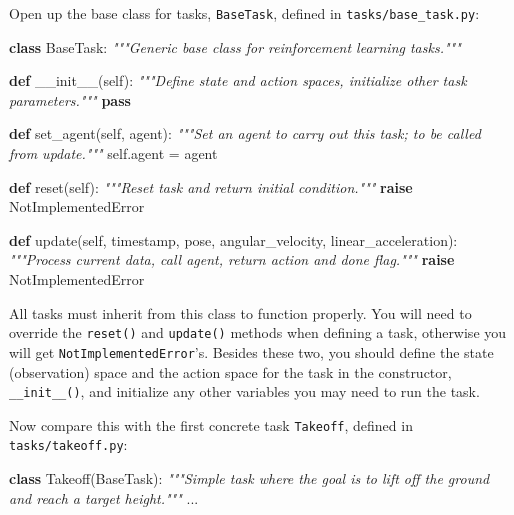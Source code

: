 \documentclass[11pt]{article}
\newenvironment{Shaded}{}{}
\newcommand{\KeywordTok}[1]{\textcolor[rgb]{0.00,0.44,0.13}{\textbf{{#1}}}}
\newcommand{\CommentTok}[1]{\textcolor[rgb]{0.38,0.63,0.69}{\textit{{#1}}}}
\newcommand{\FunctionTok}[1]{\textcolor[rgb]{0.02,0.16,0.49}{{#1}}}
\newcommand{\NormalTok}[1]{{#1}}
\newcommand{\VariableTok}[1]{\textcolor[rgb]{0.10,0.09,0.49}{{#1}}}
\newcommand{\ControlFlowTok}[1]{\textcolor[rgb]{0.00,0.44,0.13}{\textbf{{#1}}}}
\newcommand{\OperatorTok}[1]{\textcolor[rgb]{0.40,0.40,0.40}{{#1}}}
\newcommand{\PreprocessorTok}[1]{\textcolor[rgb]{0.74,0.48,0.00}{{#1}}}
\begin{document}
Open up the base class for tasks, \texttt{BaseTask}, defined in
\texttt{tasks/base\_task.py}:

\begin{Shaded}
\begin{Highlighting}[]
\KeywordTok{class}\NormalTok{ BaseTask:}
    \CommentTok{"""Generic base class for reinforcement learning tasks."""}

    \KeywordTok{def} \FunctionTok{__init__}\NormalTok{(}\VariableTok{self}\NormalTok{):}
        \CommentTok{"""Define state and action spaces, initialize other task parameters."""}
        \ControlFlowTok{pass}
    
    \KeywordTok{def}\NormalTok{ set_agent(}\VariableTok{self}\NormalTok{, agent):}
        \CommentTok{"""Set an agent to carry out this task; to be called from update."""}
        \VariableTok{self}\NormalTok{.agent }\OperatorTok{=}\NormalTok{ agent}
    
    \KeywordTok{def}\NormalTok{ reset(}\VariableTok{self}\NormalTok{):}
        \CommentTok{"""Reset task and return initial condition."""}
        \ControlFlowTok{raise} \PreprocessorTok{NotImplementedError}
    
    \KeywordTok{def}\NormalTok{ update(}\VariableTok{self}\NormalTok{, timestamp, pose, angular_velocity, linear_acceleration):}
        \CommentTok{"""Process current data, call agent, return action and done flag."""}
        \ControlFlowTok{raise} \PreprocessorTok{NotImplementedError}            
\end{Highlighting}
\end{Shaded}

All tasks must inherit from this class to function properly. You will
need to override the \texttt{reset()} and \texttt{update()} methods when
defining a task, otherwise you will get \texttt{NotImplementedError}'s.
Besides these two, you should define the state (observation) space and
the action space for the task in the constructor,
\texttt{\_\_init\_\_()}, and initialize any other variables you may need
to run the task.

Now compare this with the first concrete task \texttt{Takeoff}, defined
in \texttt{tasks/takeoff.py}:

\begin{Shaded}
\begin{Highlighting}[]
\KeywordTok{class}\NormalTok{ Takeoff(BaseTask):}
    \CommentTok{"""Simple task where the goal is to lift off the ground and reach a target height."""}
\NormalTok{    ...}
\end{Highlighting}
\end{Shaded}
\end{document}
